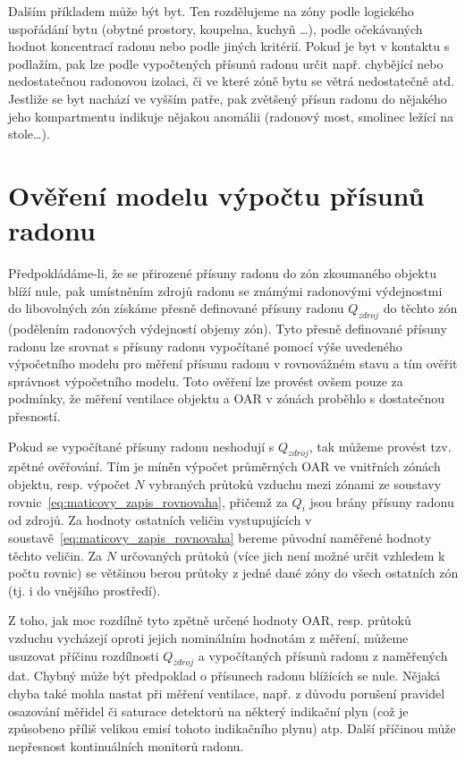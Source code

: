 Dalším příkladem může být byt. Ten rozdělujeme na zóny podle logického uspořádání bytu (obytné prostory, koupelna, kuchyň \ldots), podle očekávaných hodnot koncentrací radonu nebo podle jiných kritérií.
Pokud je byt v kontaktu s podlažím, pak lze podle vypočtených přísunů radonu určit např. chybějící nebo nedostatečnou radonovou izolaci, či ve které zóně bytu se větrá nedostatečně atd. Jestliže se byt nachází ve vyšším patře, pak zvětšený přísun radonu do nějakého jeho kompartmentu indikuje nějakou anomálii (radonový most, smolinec ležící na stole\ldots).


\section{Ověření modelu výpočtu přísunů radonu}\label{navesti:model_overeni}
Předpokládáme-li, že se přirozené přísuny radonu do zón zkoumaného objektu blíží nule, pak umístněním zdrojů radonu se známými radonovými výdejnostmi do libovolných zón získáme přesně definované přísuny radonu $Q_{zdroj}$ do těchto zón (podělením radonových výdejností objemy zón). Tyto přesně definované přísuny radonu lze srovnat s přísuny radonu vypočítané pomocí výše uvedeného výpočetního modelu pro měření přísunu radonu v rovnovážném stavu a tím ověřit správnost výpočetního modelu. Toto ověření lze provést ovšem pouze za podmínky, že měření ventilace objektu a OAR v zónách proběhlo s dostatečnou přesností.

Pokud se vypočítané přísuny radonu neshodují s $Q_{zdroj}$, tak můžeme provést tzv. zpětné ověřování. Tím je míněn výpočet průměrných OAR ve vnitřních zónách objektu, resp. výpočet $N$ vybraných průtoků vzduchu mezi zónami ze soustavy rovnic~\eqref{eq:maticovy_zapis_rovnovaha}, přičemž za $Q_i$ jsou brány přísuny radonu od zdrojů. Za hodnoty ostatních veličin vystupujících v soustavě~\eqref{eq:maticovy_zapis_rovnovaha} bereme původní naměřené hodnoty těchto veličin. Za $N$ určovaných průtoků (více jich není možné určit vzhledem k počtu rovnic) se většinou berou průtoky z jedné dané zóny do všech ostatních zón (tj. i do vnějšího prostředí).

Z toho, jak moc rozdílně tyto zpětně určené hodnoty OAR, resp. průtoků vzduchu vycházejí oproti jejich nominálním hodnotám z měření, můžeme usuzovat příčinu rozdílnosti $Q_{zdroj}$ a vypočítaných přísunů radonu z naměřených dat. Chybný může být předpoklad o přísunech radonu blížících se nule. Nějaká chyba také mohla nastat při měření ventilace, např. z důvodu porušení pravidel osazování měřidel či saturace detektorů na některý indikační plyn (což je způsobeno příliš velikou emisí tohoto indikačního plynu) atp. Další příčinou může nepřesnost kontinuálních monitorů radonu.

